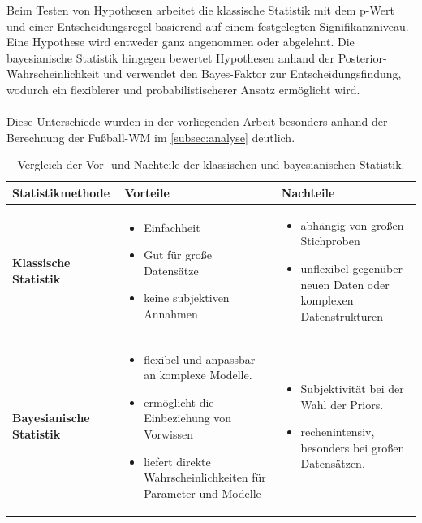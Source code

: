 \documentclass[a4paper,12pt]{article}
\begin{document}
Beim Testen von Hypothesen arbeitet die klassische Statistik mit dem p-Wert und einer Entscheidungsregel 
basierend auf einem festgelegten Signifikanzniveau. Eine Hypothese wird entweder ganz angenommen oder abgelehnt. \parencite[2]{StatistikKlassischOderBayes}
Die bayesianische Statistik hingegen bewertet Hypothesen anhand der Posterior-Wahrscheinlichkeit und verwendet 
den Bayes-Faktor zur Entscheidungsfindung, wodurch ein flexiblerer und probabilistischerer Ansatz ermöglicht wird.\\\\
Diese Unterschiede wurden in der vorliegenden Arbeit besonders anhand der 
Berechnung der Fußball-WM im \autoref{subsec:analyse} deutlich.

\newpage
\begin{table}[h!]
  \centering
  \begin{tabular}{|p{4cm}|p{5cm}|p{5cm}|}
  \hline
  \textbf{Statistikmethode} & \textbf{Vorteile} & \textbf{Nachteile} \\ \hline
  \textbf{Klassische Statistik} & 
  \begin{itemize}
      \item Einfachheit
      \item Gut für große Datensätze
      \item keine subjektiven Annahmen
  \end{itemize} & 
  \begin{itemize}
      \item abhängig von großen Stichproben
      \item unflexibel gegenüber neuen Daten oder komplexen Datenstrukturen
  \end{itemize} \\ \hline
  \textbf{Bayesianische Statistik} & 
  \begin{itemize}
      \item flexibel und anpassbar an komplexe Modelle.
      \item ermöglicht die Einbeziehung von Vorwissen
      \item liefert direkte Wahrscheinlichkeiten für Parameter und Modelle
  \end{itemize} & 
  \begin{itemize}
      \item Subjektivität bei der Wahl der Priors.
      \item rechenintensiv, besonders bei großen Datensätzen.
  \end{itemize} \\ \hline
  \end{tabular}
  \caption{Vergleich der Vor- und Nachteile der klassischen und bayesianischen Statistik.}
  \label{tab:vergleich_vor_nachteile}
\end{table}
\end{document}
